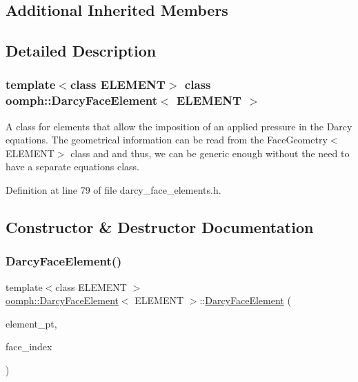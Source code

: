 \subsection*{Additional Inherited Members}


\subsection{Detailed Description}
\subsubsection*{template$<$class E\+L\+E\+M\+E\+NT$>$\newline
class oomph\+::\+Darcy\+Face\+Element$<$ E\+L\+E\+M\+E\+N\+T $>$}

A class for elements that allow the imposition of an applied pressure in the Darcy equations. The geometrical information can be read from the Face\+Geometry$<$\+E\+L\+E\+M\+E\+N\+T$>$ class and and thus, we can be generic enough without the need to have a separate equations class. 

Definition at line 79 of file darcy\+\_\+face\+\_\+elements.\+h.



\subsection{Constructor \& Destructor Documentation}
\mbox{\label{classoomph_1_1DarcyFaceElement_a71513f63463e069ac1cc1ae267f6ba5b}} 
\subsubsection{\texorpdfstring{Darcy\+Face\+Element()}{DarcyFaceElement()}}
{\footnotesize\ttfamily template$<$class E\+L\+E\+M\+E\+NT $>$ \\
\hyperlink{classoomph_1_1DarcyFaceElement}{oomph\+::\+Darcy\+Face\+Element}$<$ E\+L\+E\+M\+E\+NT $>$\+::\hyperlink{classoomph_1_1DarcyFaceElement}{Darcy\+Face\+Element} (\begin{DoxyParamCaption}\item[{\hyperlink{classoomph_1_1FiniteElement}{Finite\+Element} $\ast$const \&}]{element\+\_\+pt,  }\item[{const int \&}]{face\+\_\+index }\end{DoxyParamCaption})\hspace{0.3cm}{\ttfamily [inline]}}



